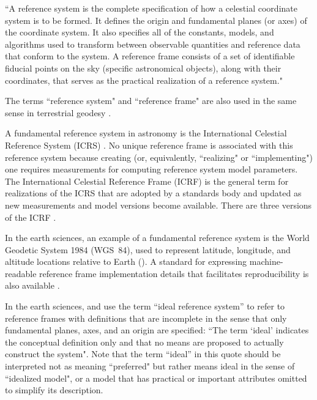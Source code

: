 \documentclass[draft]{agujournal2019}
\begin{document}
``A reference system is the complete specification of how a celestial coordinate system is to be formed. It defines the origin and fundamental planes (or axes) of the coordinate system. It also specifies all of the constants, models, and algorithms used to transform between observable quantities and reference data that conform to the system. A reference frame consists of a set of identifiable fiducial points on the sky (specific astronomical objects), along with their coordinates, that serves as the practical realization of a reference system."

The terms ``reference system" and ``reference frame" are also used in the same sense in terrestrial geodesy \cite{Seitz2014}.

A fundamental reference system in astronomy is the International Celestial Reference System (ICRS) \cite{Petit2010}. No unique reference frame is associated with this reference system because creating (or, equivalently, ``realizing" or ``implementing") one requires measurements for computing reference system model parameters. The International Celestial Reference Frame (ICRF) is the general term for realizations of the ICRS that are adopted by a standards body and updated as new measurements and model versions become available. There are three versions of the ICRF \cite{Charlot2020}. 

In the earth sciences, an example of a fundamental reference system is the World Geodetic System 1984 (WGS~84), used to represent latitude, longitude, and altitude locations relative to Earth (). A standard for expressing machine-readable reference frame implementation details that facilitates reproducibility is also available \cite{OGC2023}.

In the earth sciences,  and  use the term ``ideal reference system'' to refer to reference frames with definitions that are incomplete in the sense that only fundamental planes, axes, and an origin are specified: ``The term `ideal' indicates the conceptual definition only and that no means are proposed to actually construct the system". Note that the term ``ideal'' in this quote should be interpreted not as meaning ``preferred" but rather means ideal in the sense of ``idealized model", or a model that has practical or important attributes omitted to simplify its description.

\end{document}

